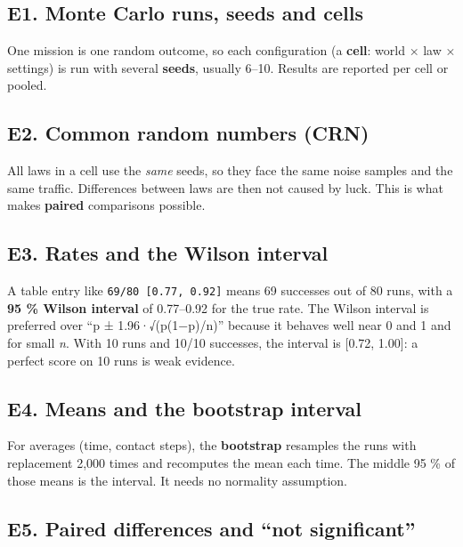 \documentclass[
  10.5pt,
  a4paper,
]{article}
\begin{document}
\hypertarget{e1.-monte-carlo-runs-seeds-and-cells}{%
\subsection{E1. Monte Carlo runs, seeds and
cells}\label{e1.-monte-carlo-runs-seeds-and-cells}}

One mission is one random outcome, so each configuration (a
\textbf{cell}: world × law × settings) is run with several
\textbf{seeds}, usually 6--10. Results are reported per cell or pooled.

\hypertarget{e2.-common-random-numbers-crn}{%
\subsection{E2. Common random numbers
(CRN)}\label{e2.-common-random-numbers-crn}}

All laws in a cell use the \emph{same} seeds, so they face the same
noise samples and the same traffic. Differences between laws are then
not caused by luck. This is what makes \textbf{paired} comparisons
possible.

\hypertarget{e3.-rates-and-the-wilson-interval}{%
\subsection{E3. Rates and the Wilson
interval}\label{e3.-rates-and-the-wilson-interval}}

A table entry like \texttt{69/80\ {[}0.77,\ 0.92{]}} means 69 successes
out of 80 runs, with a \textbf{95 \% Wilson interval} of 0.77--0.92 for
the true rate. The Wilson interval is preferred over ``p ±
1.96·√(p(1−p)/n)'' because it behaves well near 0 and 1 and for small
\emph{n}. With 10 runs and 10/10 successes, the interval is {[}0.72,
1.00{]}: a perfect score on 10 runs is weak evidence.

\hypertarget{e4.-means-and-the-bootstrap-interval}{%
\subsection{E4. Means and the bootstrap
interval}\label{e4.-means-and-the-bootstrap-interval}}

For averages (time, contact steps), the \textbf{bootstrap} resamples the
runs with replacement 2,000 times and recomputes the mean each time. The
middle 95 \% of those means is the interval. It needs no normality
assumption.

\hypertarget{e5.-paired-differences-and-not-significant}{%
\subsection{E5. Paired differences and ``not
significant''}\label{e5.-paired-differences-and-not-significant}}
\end{document}
